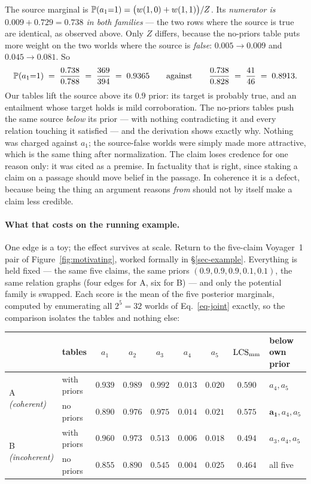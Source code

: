 The source marginal is $\mathbb{P}\!\left( a_1{=}1 \right)=\bigl(w(1,0)+w(1,1)\bigr)/Z$. Its \emph{numerator is
$0.009+0.729=0.738$ in both families} --- the two rows where the source is true are identical, as observed above.
Only $Z$ differs, because the no-priors table puts more weight on the two worlds where the source is
\emph{false}: $0.005\to0.009$ and $0.045\to0.081$. So
\begin{equation*}
\mathbb{P}\!\left( a_1{=}1 \right)\;=\;\frac{0.738}{0.788}\;=\;\frac{369}{394}\;=\;0.9365
\qquad\text{against}\qquad
\frac{0.738}{0.828}\;=\;\frac{41}{46}\;=\;0.8913 .
\end{equation*}
Our tables lift the source above its $0.9$ prior: its target is probably true, and an entailment whose target
holds is mild corroboration. The no-priors tables push the same source \emph{below} its prior --- with nothing
contradicting it and every relation touching it satisfied --- and the derivation shows exactly why. Nothing was
charged against $a_1$; the source-false worlds were simply made more attractive, which is the same thing after
normalization. The claim loses credence for one reason only: it was cited as a premise. In factuality that is
right, since staking a claim on a passage should move belief in the passage. In coherence it is a defect,
because being the thing an argument reasons \emph{from} should not by itself make a claim less credible.

\paragraph{What that costs on the running example.} One edge is a toy; the effect survives at scale. Return to
the five-claim Voyager~1 pair of Figure~\ref{fig:motivating}, worked formally in \S\ref{sec-example}. Everything
is held fixed --- the same five claims, the same priors $(0.9,0.9,0.9,0.1,0.1)$, the same relation graphs (four
edges for A, six for B) --- and only the potential family is swapped. Each score is the mean of the five
posterior marginals, computed by enumerating all $2^5=32$ worlds of Eq.~\ref{eq-joint} exactly, so the
comparison isolates the tables and nothing else:

\begin{center}\small
\begin{tabular}{@{}llccccccl@{}}
\toprule
& tables & $a_1$ & $a_2$ & $a_3$ & $a_4$ & $a_5$ & $\mathrm{LCS}_{\mathrm{mm}}$ & below own prior \\
\midrule
\multirow{2}{*}{A \emph{(coherent)}}
 & with priors & $0.939$ & $0.989$ & $0.992$ & $0.013$ & $0.020$ & $\mathbf{0.590}$ & $a_4,a_5$ \\
 & no priors   & $0.890$ & $0.976$ & $0.975$ & $0.014$ & $0.021$ & $0.575$          & $\mathbf{a_1},a_4,a_5$ \\
\midrule
\multirow{2}{*}{B \emph{(incoherent)}}
 & with priors & $0.960$ & $0.973$ & $0.513$ & $0.006$ & $0.018$ & $\mathbf{0.494}$ & $a_3,a_4,a_5$ \\
 & no priors   & $0.855$ & $0.890$ & $0.545$ & $0.004$ & $0.025$ & $0.464$          & all five \\
\bottomrule
\end{tabular}
\end{center}

